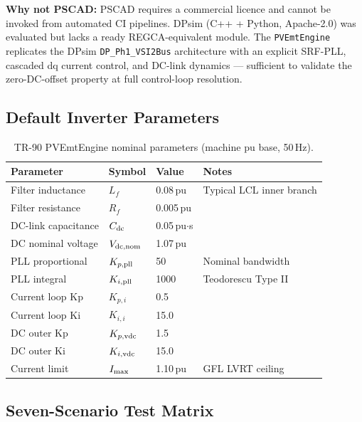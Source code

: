 \documentclass[11pt, a4paper]{article}
\begin{document}
\noindent\textbf{Why not PSCAD:}  PSCAD requires a commercial licence and
cannot be invoked from automated CI pipelines.  DPsim (C++ + Python, Apache-2.0)
was evaluated but lacks a ready REGCA-equivalent module.  The \texttt{PVEmtEngine}
replicates the DPsim \texttt{DP\_Ph1\_VSI2Bus} architecture with an explicit
SRF-PLL, cascaded dq current control, and DC-link dynamics — sufficient to
validate the zero-DC-offset property at full control-loop resolution.

\subsection{Default Inverter Parameters}

\begin{table}[!t]
\centering
\caption{TR-90 PVEmtEngine nominal parameters (machine pu base, 50\,Hz).}
\label{tab:emt_params}
\renewcommand{\arraystretch}{1.10}
\begin{tabular}{llll}
\toprule
Parameter & Symbol & Value & Notes \\
\midrule
Filter inductance   & $L_f$         & 0.08\,pu    & Typical LCL inner branch \\
Filter resistance   & $R_f$         & 0.005\,pu   & \\
DC-link capacitance & $C_{\rm dc}$  & 0.05\,pu$\cdot$s & \\
DC nominal voltage  & $V_{\rm dc,nom}$ & 1.07\,pu & \\
PLL proportional    & $K_{p,\rm pll}$  & 50        & Nominal bandwidth \\
PLL integral        & $K_{i,\rm pll}$  & 1000      & Teodorescu Type II \\
Current loop Kp     & $K_{p,i}$     & 0.5        & \\
Current loop Ki     & $K_{i,i}$     & 15.0       & \\
DC outer Kp         & $K_{p,\rm vdc}$  & 1.5      & \\
DC outer Ki         & $K_{i,\rm vdc}$  & 15.0     & \\
Current limit       & $I_{\rm max}$ & 1.10\,pu   & GFL LVRT ceiling \\
\bottomrule
\end{tabular}
\end{table}

\subsection{Seven-Scenario Test Matrix}
\end{document}
